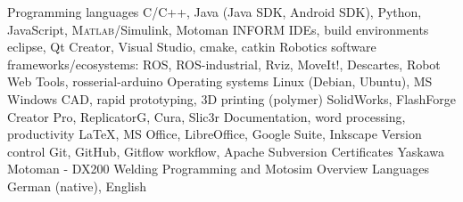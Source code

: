 
\begin{cvskills}
  \cvskill
    {Programming languages}
    {C/C++, Java (Java SDK, Android SDK), Python, JavaScript, \textsc{Matlab}/Simulink, \newline Motoman INFORM}
  \cvskill
    {IDEs, build environments}
    {eclipse, Qt Creator, Visual Studio, cmake, catkin}
  \cvskill
    {Robotics software frameworks/ecosystems:}
    {ROS, ROS-industrial, Rviz, MoveIt!, Descartes, Robot Web Tools, \newline rosserial-arduino}
  \cvskill
    {Operating systems}
    {Linux (Debian, Ubuntu), MS Windows}
  \cvskill
    {CAD, rapid prototyping, 3D printing (polymer)}
    {SolidWorks, FlashForge Creator Pro, ReplicatorG, Cura, Slic3r}
  \cvskill
    {Documentation, word processing, productivity}
    {\LaTeX, MS Office, LibreOffice, Google Suite, Inkscape}
  \cvskill
    {Version control}
    {Git, GitHub, Gitflow workflow, Apache Subversion}
  \cvskill
    {Certificates}
    {Yaskawa Motoman - DX200 Welding Programming and Motosim Overview}
  \cvskill
    {Languages}
    {German (native), English}

\end{cvskills}
